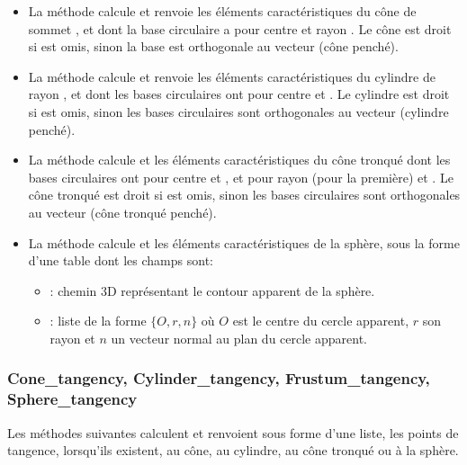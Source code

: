 \begin{itemize}
    \item La méthode  calcule et renvoie les éléments caractéristiques du cône de sommet ,  et dont la base circulaire a pour centre  et rayon . Le cône est droit si  est omis, sinon la base est orthogonale au vecteur  (cône penché).

    \item La méthode  calcule et renvoie les éléments caractéristiques du cylindre de rayon , et dont les bases circulaires ont pour centre  et . Le cylindre est droit si  est omis, sinon les bases circulaires sont orthogonales au vecteur  (cylindre penché).
    
    \item La méthode  calcule et les éléments caractéristiques du cône tronqué dont les bases circulaires ont pour centre  et , et pour rayon  (pour la première) et . Le cône tronqué est droit si  est omis, sinon les bases circulaires sont orthogonales au vecteur  (cône tronqué penché).
    
    \item La méthode  calcule et les éléments caractéristiques de la sphère, sous la forme d'une table dont les champs sont:
    \begin{itemize}
        \item {} : chemin 3D représentant le contour apparent de la sphère.
        \item {} : liste de la forme $\{O,r,n\}$ où $O$ est le centre du cercle apparent, $r$ son rayon et $n$ un vecteur normal au plan du cercle apparent.
    \end{itemize}
\end{itemize}


\subsubsection{Cone\_tangency, Cylinder\_tangency, Frustum\_tangency, Sphere\_tangency}

Les méthodes suivantes calculent et renvoient sous forme d'une liste, les points de tangence, lorsqu'ils existent, au cône, au cylindre, au cône tronqué ou à la sphère.

